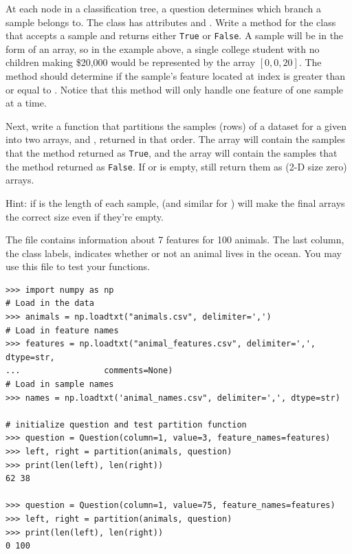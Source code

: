 \begin{problem} %
At each node in a classification tree, a question determines which branch a sample belongs to.
The  class has attributes  and .
Write a  method for the  class that accepts a sample and returns either \texttt{True} or \texttt{False}.
A sample will be in the form of an array, so in the example above, a single college student with no children making \$20,000 would be represented by the array $[0,0,20]$.
The method should determine if the sample's feature located at index  is greater than or equal to .
Notice that this method will only handle one feature of one sample at a time.

Next, write a  function that partitions the samples (rows) of a dataset for a given  into two  arrays,  and , returned in that order.
The array  will contain the samples that the  method returned as \texttt{True}, and the array  will contain the samples that the  method returned as \texttt{False}.
If  or  is empty, still return them as (2-D size zero) arrays.

Hint: if  is the length of each sample,  (and similar for ) will make the final arrays the correct size even if they're empty.

The file  contains information about 7 features for 100 animals.
The last column, the class labels, indicates whether or not an animal lives in the ocean.
You may use this file to test your functions.

\begin{lstlisting}
>>> import numpy as np
# Load in the data
>>> animals = np.loadtxt("animals.csv", delimiter=',')
# Load in feature names
>>> features = np.loadtxt("animal_features.csv", delimiter=',', dtype=str,
...					comments=None)
# Load in sample names
>>> names = np.loadtxt('animal_names.csv", delimiter=',', dtype=str)

# initialize question and test partition function
>>> question = Question(column=1, value=3, feature_names=features)
>>> left, right = partition(animals, question)
>>> print(len(left), len(right))
62 38

>>> question = Question(column=1, value=75, feature_names=features)
>>> left, right = partition(animals, question)
>>> print(len(left), len(right))
0 100
\end{lstlisting}

\label{prob:1}
\end{problem}


